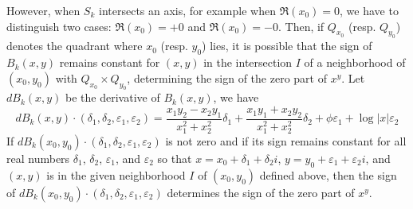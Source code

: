 \documentclass [11pt]{article}
\renewcommand {\epsilon}{\varepsilon}
\begin{document}
However, when $S_k$ intersects an axis, for example when $\Re(x_0) = 0$, we
have to distinguish two cases: $\Re(x_0) = +0$ and $\Re(x_0) = -0$.
Then, if $Q_{x_0}$ (resp. $Q_{y_0}$) denotes the quadrant where $x_0$
(resp. $y_0$) lies, it is possible that the sign of $B_k(x,y)$ remains
constant for $(x,y)$ in the intersection $I$ of a neighborhood of $(x_0, y_0)$
with $Q_{x_0}\times Q_{y_0}$, determining the sign of the zero part of $x^y$.
Let $dB_k(x,y)$ be the derivative of $B_k(x, y)$, we have
\begin {equation}
  \label {eqn:BkDerivative}
  dB_k(x, y)\cdot(\delta_1, \delta_2, \epsilon_1, \epsilon_2) =
  \frac{x_1y_2-x_2y_1}{x_1^2+x_2^2}\delta_1 +
  \frac{x_1y_1+x_2y_2}{x_1^2+x_2^2}\delta_2 +
  \phi\epsilon_1 +
  \log|x| \epsilon_2
\end {equation}
If $dB_k(x_0, y_0)\cdot(\delta_1, \delta_2, \epsilon_1, \epsilon_2)$ is not
zero and if its sign remains constant for all real numbers $\delta_1$,
$\delta_2$, $\epsilon_1$, and $\epsilon_2$ so that $x = x_0 + \delta_1 +
\delta_2i$, $y = y_0 +\epsilon_1 + \epsilon_2i$, and $(x,y)$ is in the given
neighborhood $I$ of $(x_0, y_0)$ defined above, then the sign of $dB_k(x_0,
y_0)\cdot(\delta_1, \delta_2, \epsilon_1, \epsilon_2)$ determines the sign of
the zero part of $x^y$.
\end{document}
